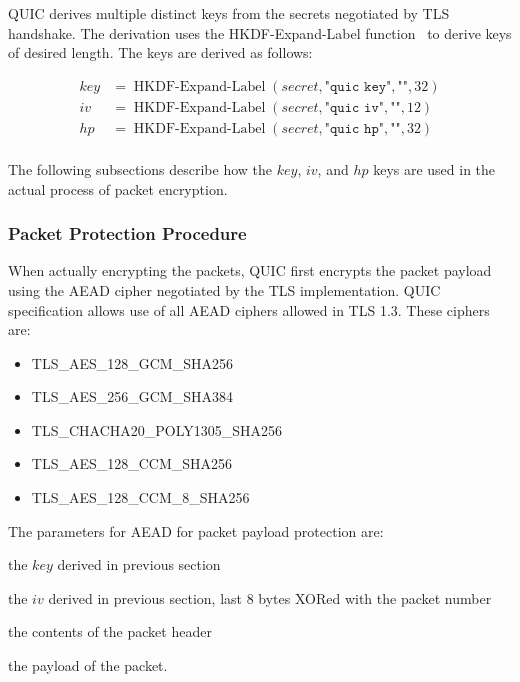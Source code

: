 QUIC derives multiple distinct keys from the secrets negotiated by TLS handshake. The derivation
uses the HKDF-Expand-Label function~\cite{rfc5869} to derive keys of desired length. The keys are
derived as follows:

\begin{equation*}
  \begin{split}
  key & = \operatorname{HKDF-Expand-Label}(secret, \texttt{"quic key"}, \texttt{""}, 32) \\
  iv  & = \operatorname{HKDF-Expand-Label}(secret, \texttt{"quic iv"}, \texttt{""}, 12)  \\
  hp  & = \operatorname{HKDF-Expand-Label}(secret, \texttt{"quic hp"}, \texttt{""}, 32)  \\
  \end{split}
\end{equation*}

The following subsections describe how the $key$, $iv$, and $hp$ keys are used in the actual process
of packet encryption.

\subsubsection{Packet Protection Procedure}

When actually encrypting the packets, QUIC first encrypts the packet payload using the AEAD cipher
negotiated by the TLS implementation. QUIC specification allows use of all AEAD ciphers allowed in
TLS 1.3. These ciphers are:

\begin{itemize}

  \item TLS\_AES\_128\_GCM\_SHA256

  \item TLS\_AES\_256\_GCM\_SHA384

  \item TLS\_CHACHA20\_POLY1305\_SHA256

  \item TLS\_AES\_128\_CCM\_SHA256

  \item TLS\_AES\_128\_CCM\_8\_SHA256

\end{itemize}


The parameters for AEAD for packet payload protection are:

\begin{itemize}

     the $key$ derived in previous section

     the $iv$ derived in previous section, last 8 bytes XORed with the packet number

     the contents of the packet header

     the payload of the packet.

\end{itemize}


